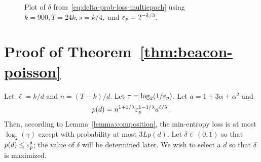 \begin{figure}
  \caption{Plot of $\delta$ from~\eqref{eq:delta-prob-loss-multiepoch} using $k = 900, T = 24k, s = k/4,$ and $\mathsf{\varepsilon}_p = 2^{-k/3}$.}
  \label{fig:poisson-beacon}
\end{figure}




\newcommand{\dMin}{d_\mathrm{min}}
\newcommand{\dMax}{d_\mathrm{max}}

\section{Proof of Theorem~\ref{thm:beacon-poisson}}

	Let $\ell = k/d$ and $n = (T - k)/d$. 
	Let $\tau = \log_2(1/\mathsf{\varepsilon}_p)$. 
	Let $a = 1 + 3 \alpha + \alpha^2$
	and 
	$$
		p(d) = n^{1+1/\lambda} \mathsf{\varepsilon}_p^{1 - 1/\lambda} a^{\ell/\lambda}
		\,.
	$$
	Then, according to Lemma~\ref{lemma:composition}, 
  the min-entropy loss is at most $\log_2(\gamma)$ 
  except with probability at most $3 L p(d)$.	
	Let $\delta \in (0, 1)$ so that $p(d) \leq \mathsf{\varepsilon}_p^\delta$; 
	the value of $\delta$ will be determined later. 
	We wish to select a $d$ so that $\delta$ is maximized.

